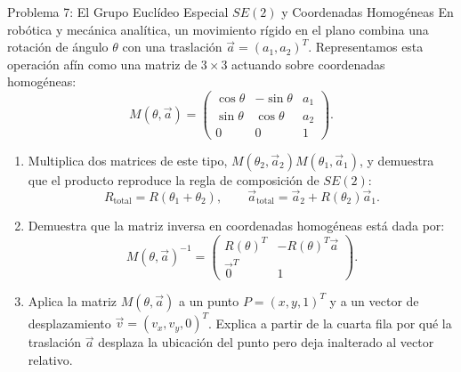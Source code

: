 \documentclass[11pt,letterpaper]{article}
\begin{document}
\begin{infobox}{Problema 7: El Grupo Euclídeo Especial $SE(2)$ y Coordenadas Homogéneas}
En robótica y mecánica analítica, un movimiento rígido en el plano combina una rotación de ángulo $\theta$ con una traslación $\vec{a} = (a_1, a_2)^T$. Representamos esta operación afín como una matriz de $3 \times 3$ actuando sobre coordenadas homogéneas:
\[
M(\theta, \vec{a}) = \begin{pmatrix} \cos\theta & -\sin\theta & a_1 \\ \sin\theta & \cos\theta & a_2 \\ 0 & 0 & 1 \end{pmatrix}.
\]
\begin{enumerate}[label=(\alph*)]
    \item Multiplica dos matrices de este tipo, $M(\theta_2, \vec{a}_2) M(\theta_1, \vec{a}_1)$, y demuestra que el producto reproduce la regla de composición de $SE(2)$:
    \[
    R_{\text{total}} = R(\theta_1 + \theta_2), \qquad \vec{a}_{\text{total}} = \vec{a}_2 + R(\theta_2)\vec{a}_1.
    \]
    \item Demuestra que la matriz inversa en coordenadas homogéneas está dada por:
    \[
    M(\theta, \vec{a})^{-1} = \begin{pmatrix} R(\theta)^T & -R(\theta)^T \vec{a} \\ \vec{0}^T & 1 \end{pmatrix}.
    \]
    \item Aplica la matriz $M(\theta, \vec{a})$ a un punto $P = (x, y, 1)^T$ y a un vector de desplazamiento $\vec{v} = (v_x, v_y, 0)^T$. Explica a partir de la cuarta fila por qué la traslación $\vec{a}$ desplaza la ubicación del punto pero deja inalterado al vector relativo.
\end{enumerate}
\end{infobox}
\end{document}
